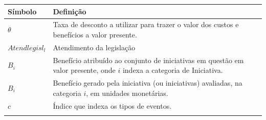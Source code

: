 \documentclass[]{article}
\begin{document}
\begin{longtable}[]{@{}ll@{}}
\toprule
\begin{minipage}[b]{0.07\columnwidth}\raggedright\strut
\textbf{Símbolo}\strut
\end{minipage} & \begin{minipage}[b]{0.87\columnwidth}\raggedright\strut
\textbf{Definição}\strut
\end{minipage}\tabularnewline
\midrule
\endhead
\begin{minipage}[t]{0.07\columnwidth}\raggedright\strut
\(\theta\)\strut
\end{minipage} & \begin{minipage}[t]{0.87\columnwidth}\raggedright\strut
Taxa de desconto a utilizar para trazer o valor dos custos e benefícios
a valor presente.\strut
\end{minipage}\tabularnewline
\begin{minipage}[t]{0.07\columnwidth}\raggedright\strut
\(Atendlegisl_{l}\)\strut
\end{minipage} & \begin{minipage}[t]{0.87\columnwidth}\raggedright\strut
Atendimento da legislação\strut
\end{minipage}\tabularnewline
\begin{minipage}[t]{0.07\columnwidth}\raggedright\strut
\(B_{i}\)\strut
\end{minipage} & \begin{minipage}[t]{0.87\columnwidth}\raggedright\strut
Benefício atribuído ao conjunto de iniciativas em questão em valor
presente, onde \(i\) indexa a categoria de Iniciativa.\strut
\end{minipage}\tabularnewline
\begin{minipage}[t]{0.07\columnwidth}\raggedright\strut
\(B_i\)\strut
\end{minipage} & \begin{minipage}[t]{0.87\columnwidth}\raggedright\strut
Benefício gerado pela iniciativa (ou iniciativas) avaliadas, na
categoria \(i\), em unidades monetárias.\strut
\end{minipage}\tabularnewline
\begin{minipage}[t]{0.07\columnwidth}\raggedright\strut
\(c\)\strut
\end{minipage} & \begin{minipage}[t]{0.87\columnwidth}\raggedright\strut
Índice que indexa os tipos de eventos.\strut
\end{minipage}\tabularnewline
\begin{minipage}[t]{0.07\columnwidth}\raggedright\strut

\end{minipage}
\end{longtable}
\end{document}
